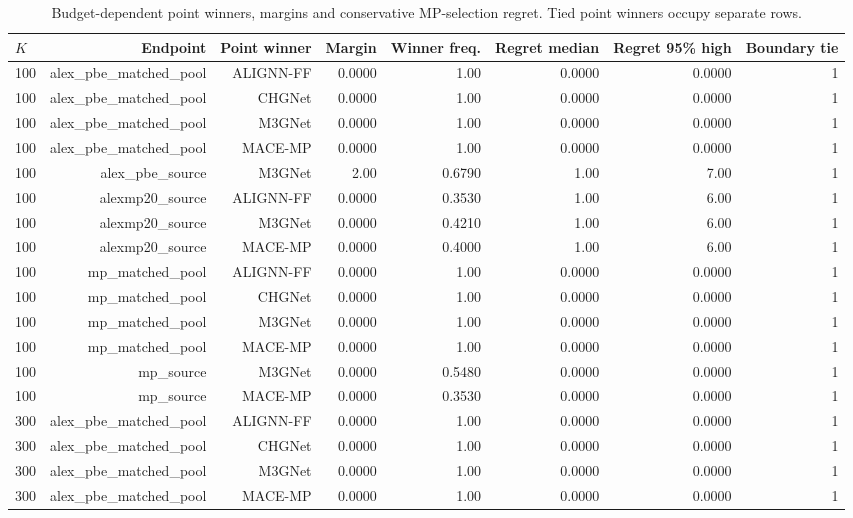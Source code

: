 \begin{table}[H]
\centering
\sitablefont
\caption{Budget-dependent point winners, margins and conservative MP-selection regret. Tied point winners occupy separate rows.}
\label{tab:v3-budget}
\begin{adjustbox}{max width=\linewidth}
\begin{tabular}{@{}lrrrrrrr@{}}
\toprule
$K$ & Endpoint & Point winner & Margin & Winner freq. & Regret median & Regret 95\% high & Boundary tie \\
\midrule
100 & alex\_pbe\_matched\_pool & ALIGNN-FF & 0.0000 & 1.00 & 0.0000 & 0.0000 & 1 \\
100 & alex\_pbe\_matched\_pool & CHGNet & 0.0000 & 1.00 & 0.0000 & 0.0000 & 1 \\
100 & alex\_pbe\_matched\_pool & M3GNet & 0.0000 & 1.00 & 0.0000 & 0.0000 & 1 \\
100 & alex\_pbe\_matched\_pool & MACE-MP & 0.0000 & 1.00 & 0.0000 & 0.0000 & 1 \\
100 & alex\_pbe\_source & M3GNet & 2.00 & 0.6790 & 1.00 & 7.00 & 1 \\
100 & alexmp20\_source & ALIGNN-FF & 0.0000 & 0.3530 & 1.00 & 6.00 & 1 \\
100 & alexmp20\_source & M3GNet & 0.0000 & 0.4210 & 1.00 & 6.00 & 1 \\
100 & alexmp20\_source & MACE-MP & 0.0000 & 0.4000 & 1.00 & 6.00 & 1 \\
100 & mp\_matched\_pool & ALIGNN-FF & 0.0000 & 1.00 & 0.0000 & 0.0000 & 1 \\
100 & mp\_matched\_pool & CHGNet & 0.0000 & 1.00 & 0.0000 & 0.0000 & 1 \\
100 & mp\_matched\_pool & M3GNet & 0.0000 & 1.00 & 0.0000 & 0.0000 & 1 \\
100 & mp\_matched\_pool & MACE-MP & 0.0000 & 1.00 & 0.0000 & 0.0000 & 1 \\
100 & mp\_source & M3GNet & 0.0000 & 0.5480 & 0.0000 & 0.0000 & 1 \\
100 & mp\_source & MACE-MP & 0.0000 & 0.3530 & 0.0000 & 0.0000 & 1 \\
300 & alex\_pbe\_matched\_pool & ALIGNN-FF & 0.0000 & 1.00 & 0.0000 & 0.0000 & 1 \\
300 & alex\_pbe\_matched\_pool & CHGNet & 0.0000 & 1.00 & 0.0000 & 0.0000 & 1 \\
300 & alex\_pbe\_matched\_pool & M3GNet & 0.0000 & 1.00 & 0.0000 & 0.0000 & 1 \\
300 & alex\_pbe\_matched\_pool & MACE-MP & 0.0000 & 1.00 & 0.0000 & 0.0000 & 1 \\

\end{tabular}
\end{adjustbox}
\end{table}
